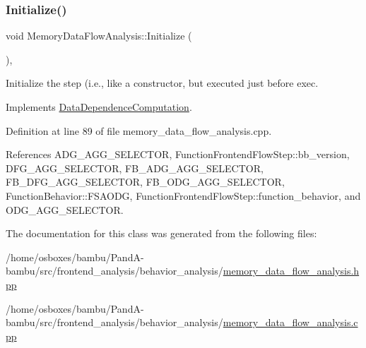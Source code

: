 \mbox{\label{classMemoryDataFlowAnalysis_a7c26b870182fa981eab5056955fd89d9}} 
\subsubsection{\texorpdfstring{Initialize()}{Initialize()}}
{\footnotesize\ttfamily void Memory\+Data\+Flow\+Analysis\+::\+Initialize (\begin{DoxyParamCaption}{ }\end{DoxyParamCaption})\hspace{0.3cm}{\ttfamily [override]}, {\ttfamily [virtual]}}



Initialize the step (i.\+e., like a constructor, but executed just before exec. 



Implements \hyperlink{classDataDependenceComputation_adeeabf6602796c390b4e331e553c71b9}{Data\+Dependence\+Computation}.



Definition at line 89 of file memory\+\_\+data\+\_\+flow\+\_\+analysis.\+cpp.



References A\+D\+G\+\_\+\+A\+G\+G\+\_\+\+S\+E\+L\+E\+C\+T\+OR, Function\+Frontend\+Flow\+Step\+::bb\+\_\+version, D\+F\+G\+\_\+\+A\+G\+G\+\_\+\+S\+E\+L\+E\+C\+T\+OR, F\+B\+\_\+\+A\+D\+G\+\_\+\+A\+G\+G\+\_\+\+S\+E\+L\+E\+C\+T\+OR, F\+B\+\_\+\+D\+F\+G\+\_\+\+A\+G\+G\+\_\+\+S\+E\+L\+E\+C\+T\+OR, F\+B\+\_\+\+O\+D\+G\+\_\+\+A\+G\+G\+\_\+\+S\+E\+L\+E\+C\+T\+OR, Function\+Behavior\+::\+F\+S\+A\+O\+DG, Function\+Frontend\+Flow\+Step\+::function\+\_\+behavior, and O\+D\+G\+\_\+\+A\+G\+G\+\_\+\+S\+E\+L\+E\+C\+T\+OR.



The documentation for this class was generated from the following files\+:\begin{DoxyCompactItemize}
\item 
/home/osboxes/bambu/\+Pand\+A-\/bambu/src/frontend\+\_\+analysis/behavior\+\_\+analysis/\hyperlink{memory__data__flow__analysis_8hpp}{memory\+\_\+data\+\_\+flow\+\_\+analysis.\+hpp}\item 
/home/osboxes/bambu/\+Pand\+A-\/bambu/src/frontend\+\_\+analysis/behavior\+\_\+analysis/\hyperlink{memory__data__flow__analysis_8cpp}{memory\+\_\+data\+\_\+flow\+\_\+analysis.\+cpp}\end{DoxyCompactItemize}
